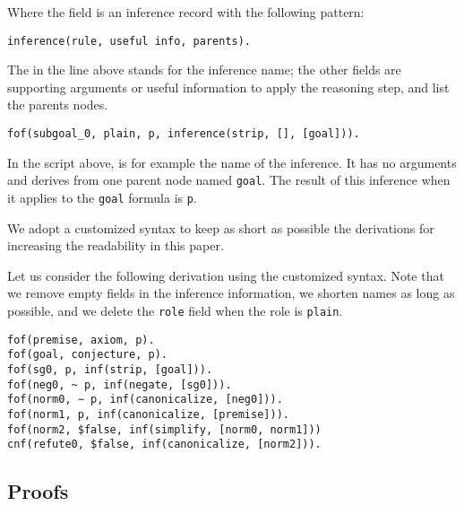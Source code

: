 \documentclass[../main.tex]{subfiles}
\begin{document}
Where the  field is an inference record with the following
pattern:

\begin{verbatim}
inference(rule, useful info, parents).
\end{verbatim}

The  in the line above stands for the inference name;
the other fields are supporting arguments or useful information to
apply the reasoning step, and list the parents nodes.

\begin{myexample}

\begin{verbatim}
fof(subgoal_0, plain, p, inference(strip, [], [goal])).
\end{verbatim}

In the script above, \strip is for example the name of the inference.
It has no arguments and derives from one parent node named  \verb!goal!. The
result of this inference when it applies to the \verb!goal! formula is
\verb!p!.

\end{myexample}

We adopt a customized \TSTP syntax to keep as short as possible the \Metis derivations for increasing the readability in this paper.

\begin{myexample}

Let us consider the following \TSTP derivation using
the customized \TSTP syntax. Note that we remove
empty fields in the inference information, we shorten names as long as possible, and we delete the \verb!role! field when the role is
\verb!plain!.

\begin{verbatim}
fof(premise, axiom, p).
fof(goal, conjecture, p).
fof(sg0, p, inf(strip, [goal])).
fof(neg0, ~ p, inf(negate, [sg0])).
fof(norm0, ∼ p, inf(canonicalize, [neg0])).
fof(norm1, p, inf(canonicalize, [premise])).
fof(norm2, $false, inf(simplify, [norm0, norm1]))
cnf(refute0, $false, inf(canonicalize, [norm2])).
\end{verbatim}

\end{myexample}


\subsection{Proofs}
\label{ssec:metis-proofs}
\end{document}
